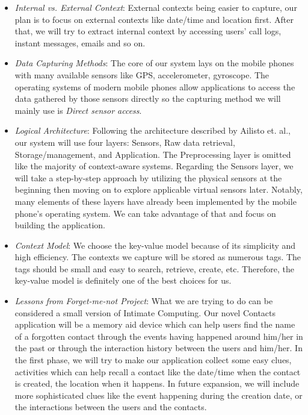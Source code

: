 \begin{itemize}
    \item \textit{Internal vs. External Context}: External contexts being easier to capture, our plan is to focus on external contexts like date/time and location first. After that, we will try to extract internal context by accessing users' call logs, instant messages, emails and so on.
    \item \textit{Data Capturing Methods}: The core of our system lays on the mobile phones with many available sensors like GPS, accelerometer, gyroscope. The operating systems of modern mobile phones allow applications to access the data gathered by those sensors directly so the capturing method we will mainly use is \textit{Direct sensor access}.
    \item \textit{Logical Architecture}: Following the architecture described by Ailisto et. al., our system will use four layers: Sensors, Raw data retrieval, Storage/management, and Application. The Preprocessing layer is omitted like the majority of context-aware systems. Regarding the Sensors layer, we will take a step-by-step approach by utilizing the physical sensors at the beginning then moving on to explore applicable virtual sensors later. Notably, many elements of these layers have already been implemented by the mobile phone's operating system. We can take advantage of that and focus on building the application.
    \item \textit{Context Model}: We choose the key-value model because of its simplicity and high efficiency. The contexts we capture will be stored as numerous tags. The tags should be small and easy to search, retrieve, create, etc. Therefore, the key-value model is definitely one of the best choices for us.
    \item \textit{Lessons from Forget-me-not Project}: What we are trying to do can be considered a small version of Intimate Computing. Our novel Contacts application will be a memory aid device which can help users find the name of a forgotten contact through the events having happened around him/her in the past or through the interaction history between the users and him/her. In the first phase, we will try to make our application collect some easy clues, activities which can help recall a contact like the date/time when the contact is created, the location when it happens. In future expansion, we will include more sophisticated clues like the event happening during the creation date, or the interactions between the users and the contacts.
\end{itemize}

